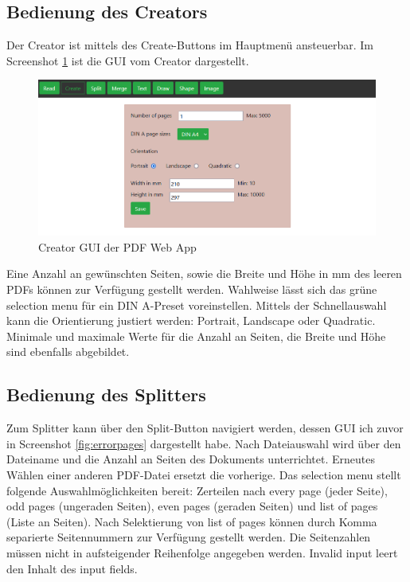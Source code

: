 \subsection{Bedienung des Creators}
Der Creator ist mittels des Create-Buttons im Hauptmenü ansteuerbar. Im Screenshot \ref{fig:creator} ist die GUI vom Creator dargestellt. 

\begin{figure}[!htbp]
	\centering
	\includegraphics[width=1\textwidth]{"images/creator.png"}
	\caption{Creator GUI der PDF Web App}
	\label{fig:creator}
\end{figure}

Eine Anzahl an gewünschten Seiten, sowie die Breite und Höhe in mm des leeren PDFs können zur Verfügung gestellt werden. Wahlweise lässt sich das grüne selection menu für ein DIN A-Preset voreinstellen. Mittels der Schnellauswahl kann die Orientierung justiert werden: Portrait, Landscape oder Quadratic. Minimale und maximale Werte für die Anzahl an Seiten, die Breite und Höhe sind ebenfalls abgebildet. 

\subsection{Bedienung des Splitters}
Zum Splitter kann über den Split-Button navigiert werden, dessen GUI ich zuvor in Screenshot \ref{fig:errorpages} dargestellt habe. Nach Dateiauswahl wird über den Dateiname und die Anzahl an Seiten des Dokuments unterrichtet. Erneutes Wählen einer anderen PDF-Datei ersetzt die vorherige. Das selection menu stellt folgende Auswahlmöglichkeiten bereit: Zerteilen nach every page (jeder Seite), odd pages (ungeraden Seiten), even pages (geraden Seiten) und list of pages (Liste an Seiten). Nach Selektierung von list of pages können durch Komma separierte Seitennummern zur Verfügung gestellt werden. Die Seitenzahlen müssen nicht in aufsteigender Reihenfolge angegeben werden. Invalid input leert den Inhalt des input fields. 

